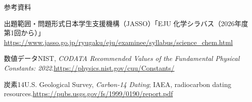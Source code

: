 \documentclass[notheorems,aspectratio=169]{beamer}
\begin{document}
\begin{frame}[shrink=8]{参考資料}
\small
\begin{block}{出題範囲・問題形式}日本学生支援機構（JASSO）「EJU 化学シラバス（2026年度第1回から）」\newline\url{https://www.jasso.go.jp/ryugaku/eju/examinee/syllabus/science_chem.html}\end{block}
\begin{block}{数値データ}NIST, \textit{CODATA Recommended Values of the Fundamental Physical Constants: 2022}.\newline\url{https://physics.nist.gov/cuu/Constants/}\end{block}
\begin{block}{炭素14}U.S. Geological Survey, \textit{Carbon-14 Dating}; IAEA, radiocarbon dating resources.\newline\url{https://pubs.usgs.gov/fs/1999/0190/report.pdf}\end{block}
\end{frame}
\end{document}

